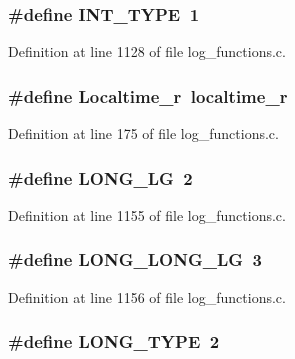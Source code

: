 \subsubsection[{INT\_\-TYPE}]{\setlength{\rightskip}{0pt plus 5cm}\#define INT\_\-TYPE~1}\label{log__functions_8c_c29eb1421065a6544048e884e95a61c6}




Definition at line 1128 of file log\_\-functions.c.
\subsubsection[{Localtime\_\-r}]{\setlength{\rightskip}{0pt plus 5cm}\#define Localtime\_\-r~localtime\_\-r}\label{log__functions_8c_61fa1aca88aec5370822f995ded637b3}




Definition at line 175 of file log\_\-functions.c.
\subsubsection[{LONG\_\-LG}]{\setlength{\rightskip}{0pt plus 5cm}\#define LONG\_\-LG~2}\label{log__functions_8c_3b0b0d94185164aeb700eb8e9bcd59bc}




Definition at line 1155 of file log\_\-functions.c.
\subsubsection[{LONG\_\-LONG\_\-LG}]{\setlength{\rightskip}{0pt plus 5cm}\#define LONG\_\-LONG\_\-LG~3}\label{log__functions_8c_5c0abad42e8756d654ac6e6e296d394a}




Definition at line 1156 of file log\_\-functions.c.
\subsubsection[{LONG\_\-TYPE}]{\setlength{\rightskip}{0pt plus 5cm}\#define LONG\_\-TYPE~2}\label{log__functions_8c_adeaa627bb705a303b5c952c2bdebdad}





